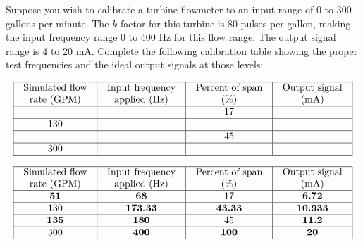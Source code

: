 

Suppose you wish to calibrate a turbine flowmeter to an input range of 0 to 300 gallons per minute.  The $k$ factor for this turbine is 80 pulses per gallon, making the input frequency range 0 to 400 Hz for this flow range.  The output signal range is 4 to 20 mA.  Complete the following calibration table showing the proper test frequencies and the ideal output signals at those levels:


$$\vbox{\offinterlineskip
\halign{\strut
\vrule \quad\hfil # \ \hfil & 
\vrule \quad\hfil # \ \hfil & 
\vrule \quad\hfil # \ \hfil & 
\vrule \quad\hfil # \ \hfil \vrule \cr
\noalign{\hrule}
%
Simulated flow & Input frequency & Percent of span & Output signal \cr
%
rate (GPM) & applied (Hz) & (\%) & (mA) \cr
%
\noalign{\hrule}
%
 &  & 17 &  \cr
%
\noalign{\hrule}
%
130 &  &  &  \cr
%
\noalign{\hrule}
%
 &  & 45 &  \cr
%
\noalign{\hrule}
%
300 &  &  &  \cr
%
\noalign{\hrule}
} %
}$$ %








$$\vbox{\offinterlineskip
\halign{\strut
\vrule \quad\hfil # \ \hfil & 
\vrule \quad\hfil # \ \hfil & 
\vrule \quad\hfil # \ \hfil & 
\vrule \quad\hfil # \ \hfil \vrule \cr
\noalign{\hrule}
%
Simulated flow & Input frequency & Percent of span & Output signal \cr
%
rate (GPM) & applied (Hz) & (\%) & (mA) \cr
%
\noalign{\hrule}
%
{\bf 51} & {\bf 68} & 17 & {\bf 6.72} \cr
%
\noalign{\hrule}
%
130 & {\bf 173.33} & {\bf 43.33} & {\bf 10.933} \cr
%
\noalign{\hrule}
%
{\bf 135} & {\bf 180} & 45 & {\bf 11.2} \cr
%
\noalign{\hrule}
%
300 & {\bf 400} & {\bf 100} & {\bf 20} \cr
%
\noalign{\hrule}
} %
}$$ %









